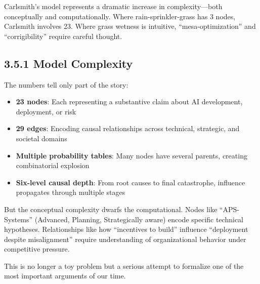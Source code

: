 \documentclass[
  11pt,
  letterpaper,
  openany]{book}
\providecommand{\tightlist}{%
  \setlength{\itemsep}{0pt}\setlength{\parskip}{0pt}}
\begin{document}
Carlsmith's model represents a dramatic increase in complexity---both
conceptually and computationally. Where rain-sprinkler-grass has 3
nodes, Carlsmith involves 23. Where grass wetness is intuitive,
``mesa-optimization'' and ``corrigibility'' require careful thought.

\subsection{3.5.1 Model Complexity}\label{sec-carlsmith-complexity}

The numbers tell only part of the story:

\begin{itemize}
\tightlist
\item
  \textbf{23 nodes}: Each representing a substantive claim about AI
  development, deployment, or risk
\item
  \textbf{29 edges}: Encoding causal relationships across technical,
  strategic, and societal domains
\item
  \textbf{Multiple probability tables}: Many nodes have several parents,
  creating combinatorial explosion
\item
  \textbf{Six-level causal depth}: From root causes to final
  catastrophe, influence propagates through multiple stages
\end{itemize}

But the conceptual complexity dwarfs the computational. Nodes like
``APS-Systems'' (Advanced, Planning, Strategically aware) encode
specific technical hypotheses. Relationships like how ``incentives to
build'' influence ``deployment despite misalignment'' require
understanding of organizational behavior under competitive pressure.

This is no longer a toy problem but a serious attempt to formalize one
of the most important arguments of our time.
\end{document}
